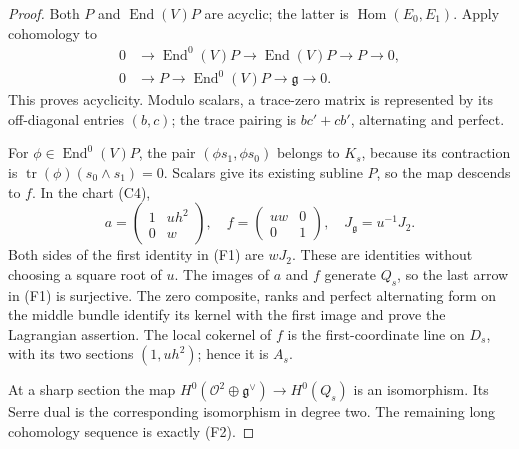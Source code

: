 \documentclass[11pt]{article}
\theoremstyle{definition}\newtheorem{definition}[theorem]{Definition}
\theoremstyle{remark}\newtheorem{remark}[theorem]{Remark}
\newcommand{\OO}{\mathcal O}
\begin{document}
\begin{proof}
Both $P$ and $\operatorname{End}(V)P$ are acyclic; the latter is $\operatorname{Hom}(E_0,E_1)$. Apply cohomology to
\[\begin{split}
0&\to\operatorname{End}^0(V)P\to\operatorname{End}(V)P\to P\to0,\\
0&\to P\to\operatorname{End}^0(V)P\to\mathfrak g\to0.
\end{split}\]
This proves acyclicity. Modulo scalars, a trace-zero matrix is represented by its off-diagonal entries $(b,c)$; the trace pairing is $bc'+cb'$, alternating and perfect.

For $\phi\in\operatorname{End}^0(V)P$, the pair
$(\phi s_1,\phi s_0)$ belongs to $K_s$, because its contraction is
$\operatorname{tr}(\phi)(s_0\wedge s_1)=0$. Scalars give its existing subline $P$, so the map descends to $f$. In the chart (C4),
\[
 a=\begin{pmatrix}1&uh^2\\0&w\end{pmatrix},\quad
 f=\begin{pmatrix}uw&0\\0&1\end{pmatrix},\quad
 J_{\mathfrak g}=u^{-1}J_2.
\]
Both sides of the first identity in (F1) are $wJ_2$. These are identities without choosing a square root of $u$. The images of $a$ and $f$ generate $Q_s$, so the last arrow in (F1) is surjective. The zero composite, ranks and perfect alternating form on the middle bundle identify its kernel with the first image and prove the Lagrangian assertion. The local cokernel of $f$ is the first-coordinate line on $D_s$, with its two sections $(1,uh^2)$; hence it is $A_s$.

At a sharp section the map $H^0(\OO^2\oplus\mathfrak g^\vee)\to H^0(Q_s)$ is an isomorphism. Its Serre dual is the corresponding isomorphism in degree two. The remaining long cohomology sequence is exactly (F2).
\end{proof}
\end{document}
